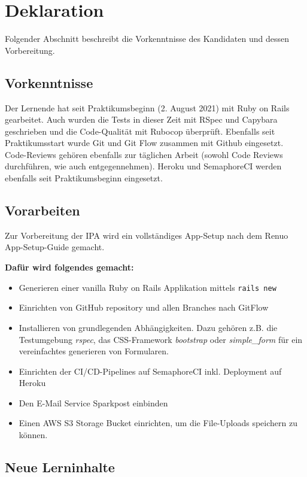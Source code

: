 \chapter{Deklaration} \label{ch:declaration}

Folgender Abschnitt beschreibt die Vorkenntnisse des Kandidaten und dessen Vorbereitung.

\section{Vorkenntnisse}

Der Lernende hat seit Praktikumsbeginn (2. August 2021) mit Ruby on Rails gearbeitet. Auch wurden die Tests in dieser Zeit mit RSpec und Capybara geschrieben und die Code-Qualität mit Rubocop überprüft.
Ebenfalls seit Praktikumsstart wurde Git und Git Flow zusammen mit Github eingesetzt. Code-Reviews gehören ebenfalls zur täglichen Arbeit (sowohl Code Reviews durchführen, wie auch entgegennehmen).
Heroku und SemaphoreCI werden ebenfalls seit Praktikumsbeginn eingesetzt.

\section{Vorarbeiten}

Zur Vorbereitung der IPA wird ein vollständiges App-Setup nach dem Renuo App-Setup-Guide gemacht.

\textbf{Dafür wird folgendes gemacht:}
\begin{itemize}
    \item Generieren einer vanilla Ruby on Rails Applikation mittels \texttt{rails new}
    \item Einrichten von GitHub repository und allen Branches nach GitFlow
    \item Installieren von grundlegenden Abhängigkeiten. Dazu gehören z.B. die Testumgebung \emph{rspec},
          das CSS-Framework \emph{bootstrap} oder \emph{simple\_form} für ein vereinfachtes generieren von Formularen.
    \item Einrichten der CI/CD-Pipelines auf SemaphoreCI inkl. Deployment auf Heroku
    \item Den E-Mail Service Sparkpost einbinden
    \item Einen AWS S3 Storage Bucket einrichten, um die File-Uploads speichern zu können.
\end{itemize}

\section{Neue Lerninhalte}

